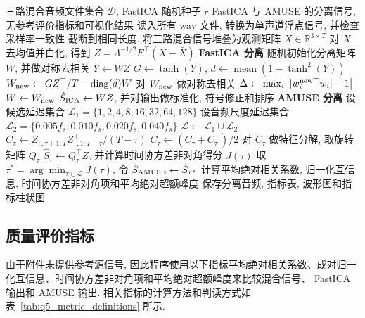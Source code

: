 ﻿\documentclass[UTF8,  zihao=-4]{ctexart}
\begin{document}
\begin{algorithm}[htbp]
\caption{第5题盲源分离实验流程}
\label{alg:q5}
\small
\begin{algorithmic}[1]
\Require 三路混合音频文件集合 \(\mathcal D\),  FastICA 随机种子 \(r\)
\Ensure FastICA 与 AMUSE 的分离信号,  无参考评价指标和可视化结果
\State 读入所有 wav 文件,  转换为单声道浮点信号,  并检查采样率一致性
\State 截断到相同长度,  将三路混合信号堆叠为观测矩阵 \(X\in\mathbb R^{3\times T}\)
\State 对 \(X\) 去均值并白化,  得到 \(Z=\Lambda^{-1/2}E^\top(X-\bar X)\)
\Statex
\State \textbf{FastICA 分离}
\State 随机初始化分离矩阵 \(W\),  并做对称去相关
\Repeat
    \State \(Y\gets WZ\)
    \State \(G\gets \tanh(Y)\),  \(d\gets \operatorname{mean}(1-\tanh^2(Y))\)
    \State \(W_{\rm new}\gets GZ^\top/T-\operatorname{diag}(d)W\)
    \State 对 \(W_{\rm new}\) 做对称去相关
    \State \(\Delta\gets \max_i\left||w_i^{\rm new\top}w_i|-1\right|\)
    \State \(W\gets W_{\rm new}\)
\State \(\hat S_{\rm ICA}\gets WZ\),  并对输出做标准化,  符号修正和排序
\Statex
\State \textbf{AMUSE 分离}
\State 设候选延迟集合 \(\mathcal L_1=\{1,  2,  4,  8,  16,  32,  64,  128\}\)
\State 设音频尺度延迟集合 \(\mathcal L_2=\{0.005f_s,  0.010f_s,  0.020f_s,  0.040f_s\}\)
\State \(\mathcal L\gets\mathcal L_1\cup\mathcal L_2\)
    \State \(C_\tau\gets Z_{:,  \tau+1: T}Z_{:,  1: T-\tau}^{\top}/(T-\tau)\)
    \State \(\widetilde C_\tau\gets (C_\tau+C_\tau^\top)/2\)
    \State 对 \(\widetilde C_\tau\) 做特征分解,  取旋转矩阵 \(Q_\tau\)
    \State \(\hat S_\tau\gets Q_\tau^\top Z\),  并计算时间协方差非对角得分 \(J(\tau)\)
\EndFor
\State 取 \(\tau^*=\arg\min_{\tau\in\mathcal L}J(\tau)\),  令 \(\hat S_{\rm AMUSE}\gets\hat S_{\tau^*}\)
\Statex
{}
    \State 计算平均绝对相关系数,  归一化互信息,  时间协方差非对角项和平均绝对超额峰度
\EndFor
\State 保存分离音频,  指标表,  波形图和指标柱状图
\end{algorithmic}
\end{algorithm}

\subsection{质量评价指标}

由于附件未提供参考源信号,  因此程序使用以下指标平均绝对相关系数、成对归一化互信息、时间协方差非对角项和平均绝对超额峰度来比较混合信号、 FastICA 输出和 AMUSE 输出. 相关指标的计算方法和判读方式如表~\ref{tab:q5_metric_definitions} 所示.
\end{document}

